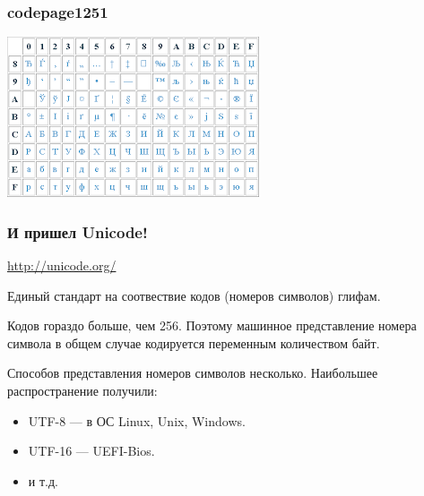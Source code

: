 \begin{frame}
    \frametitle{codepage1251}
    
    \begin{center}
        \includegraphics[width=.95\textwidth]{fig/cp1251}
    \end{center}
\end{frame}

\begin{frame}
    \frametitle{И пришел Unicode!}

    \url{http://unicode.org/}
    
    Единый стандарт на соотвествие кодов (номеров символов) глифам.
    
    \begin{block}{}
        Кодов гораздо больше, чем 256. Поэтому машинное представление номера символа в общем случае кодируется переменным количеством байт.
    \end{block}
    
    Способов представления номеров символов несколько. Наибольшее распространение получили:
    \begin{itemize}
        \item UTF-8 --- в ОС Linux, Unix, Windows.
        \item UTF-16 --- UEFI-Bios.
        \item и т.д.
    \end{itemize}
\end{frame}

